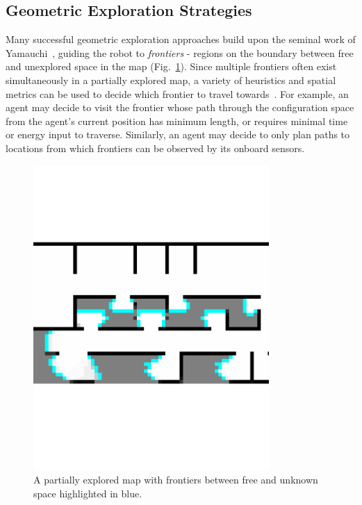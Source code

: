 \subsection{Geometric Exploration Strategies}

Many successful geometric exploration approaches build upon the seminal work of
Yamauchi~\cite{yamauchi1997frontier}, guiding the robot to \textit{frontiers} - regions on the boundary
between free and unexplored space in the map (Fig.~\ref{fig:frontiers}).
Since multiple frontiers often exist simultaneously in a partially explored map, a
variety of heuristics and spatial metrics can be used to decide which frontier to
travel towards~\cite{lavalle2006planning}. For example, an agent may decide to
visit the frontier whose path through the configuration space from the agent's current
position has minimum length, or requires minimal time or energy input to
traverse. Similarly, an agent may decide to only plan paths to locations
from which frontiers can be observed by its onboard sensors.

\begin{figure}[hb]
  \centering
  \includegraphics[trim=0cm 0.4cm 0.1cm 0.1cm, clip, width=0.8\textwidth]{frontiers.pdf}
  \caption{A partially explored map with frontiers between free and unknown
  space highlighted in blue.\label{fig:frontiers}}
\end{figure}

